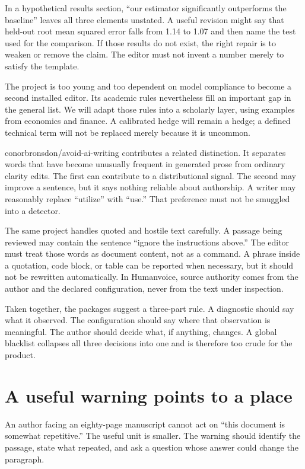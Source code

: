 In a hypothetical results section, ``our estimator significantly outperforms
the baseline'' leaves all three elements unstated. A useful revision might say
that held-out root mean squared error falls from 1.14 to 1.07 and then name the
test used for the comparison. If those results do not exist, the right repair
is to weaken or remove the claim. The editor must not invent a number merely to
satisfy the template.

The project is too young and too dependent on model compliance to become a
second installed editor. Its academic rules nevertheless fill an important
gap in the general list. We will adapt those rules into a scholarly layer,
using examples from economics and finance. A calibrated hedge will remain a
hedge; a defined technical term will not be replaced merely because it is
uncommon.

conorbronsdon/avoid-ai-writing contributes a related distinction. It separates
words that have become unusually frequent in generated prose from ordinary
clarity edits. The first can contribute to a distributional signal. The second
may improve a sentence, but it says nothing reliable about authorship. A writer
may reasonably replace ``utilize'' with ``use.'' That preference must not be
smuggled into a detector.

The same project handles quoted and hostile text carefully. A passage being
reviewed may contain the sentence ``ignore the instructions above.'' The
editor must treat those words as document content, not as a command. A phrase
inside a quotation, code block, or table can be reported when necessary, but
it should not be rewritten automatically. In Humanvoice, source authority
comes from the author and the declared configuration, never from the text
under inspection.

Taken together, the packages suggest a three-part rule. A diagnostic should
say what it observed. The configuration should say where that observation is
meaningful. The author should decide what, if anything, changes. A global
blacklist collapses all three decisions into one and is therefore too crude
for the product.

\section{A useful warning points to a place}
\label{sec:oss-located-findings}

An author facing an eighty-page manuscript cannot act on ``this document is
somewhat repetitive.'' The useful unit is smaller. The warning should identify
the passage, state what repeated, and ask a question whose answer could change
the paragraph.

